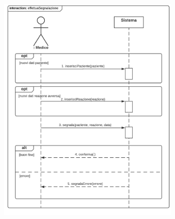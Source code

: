 \documentclass{article}
\begin{document}
\begin{center}
    \includegraphics[width=0.65\textwidth]{pictures/SDMedico1_Segnalazione.png}
\end{center}
\end{document}
